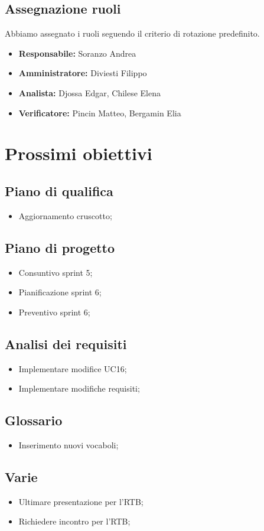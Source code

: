 \subsection{Assegnazione ruoli}
Abbiamo assegnato i ruoli seguendo il criterio di rotazione predefinito.
\begin{itemize}
    \item \textbf{Responsabile:} Soranzo Andrea
    \item \textbf{Amministratore:} Diviesti Filippo
    \item \textbf{Analista:} Djossa Edgar, Chilese Elena
    \item \textbf{Verificatore:} Pincin Matteo, Bergamin Elia
\end{itemize}

\section{Prossimi obiettivi}

\subsection{Piano di qualifica}
\begin{itemize}
    \item Aggiornamento cruscotto;
\end{itemize}

\subsection{Piano di progetto}
\begin{itemize}
    \item Consuntivo sprint 5;
    \item Pianificazione sprint 6;
    \item Preventivo sprint 6;
\end{itemize}

\subsection{Analisi dei requisiti}
\begin{itemize}
    \item Implementare modifice UC16;
    \item Implementare modifiche requisiti;
\end{itemize}

\subsection{Glossario}
\begin{itemize}
    \item Inserimento nuovi vocaboli;
\end{itemize}

\subsection{Varie}
\begin{itemize}
    \item Ultimare presentazione per l'RTB;
    \item Richiedere incontro per l'RTB;
\end{itemize}
